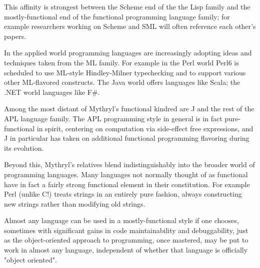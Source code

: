 This affinity is strongest between the Scheme end of the the Lisp 
family and the mostly-functional end of the functional programming 
language family;  for example researchers working on Scheme and SML 
will often reference each other's papers.

In the applied world programming languages are increasingly adopting 
ideas and techniques taken from the ML family.  For example in the Perl world 
Perl6 is scheduled to use ML-style Hindley-Milner typechecking and to support various 
other ML-flavored constructs.  The Java world offers languages like Scala;  the 
{\sc .NET} world languages like F\#.

Among the most distant of Mythryl's functional kindred are J and the 
rest of the APL language family.  The APL programming style in general 
is in fact pure-functional in spirit, centering on computation via 
side-effect free expressions, and J in particular has taken on additional 
functional programming flavoring during its evolution.

Beyond this, Mythryl's relatives blend indistinguishably into the 
broader world of programming languages.  Many languages not normally 
thought of as functional have in fact a fairly strong functional 
element in their constitution.  For example Perl (unlike C!) treats 
strings in an entirely pure fashion, always constructing new 
strings rather than modifying old strings.

Almost any language can be used in a mostly-functional style if one 
chooses, sometimes with significant gains in code maintainability and 
debuggability, just as the object-oriented approach to programming, 
once mastered, may be put to work in almost any language, independent 
of whether that language is officially "object oriented".




